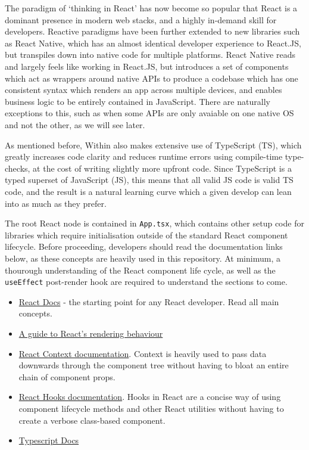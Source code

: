 The paradigm of `thinking in React' has now become so popular that React is a dominant presence in modern web stacks, and a highly in-demand skill for developers. Reactive paradigms have been further extended to new libraries such as React Native, which has an almost identical developer experience to React.JS, but transpiles down into native code for multiple platforms. React Native reads and largely feels like working in React.JS, but introduces a set of components which act as wrappers around native APIs to produce a codebase which has one consistent syntax which renders an app across multiple devices, and enables business logic to be entirely contained in JavaScript. There are naturally exceptions to this, such as when some APIs are only avaiable on one native OS and not the other, as we will see later.

As mentioned before, Within also makes extensive use of TypeScript (TS), which greatly increases code clarity and reduces runtime errors using compile-time type-checks, at the cost of writing slightly more upfront code. Since TypeScript is a typed superset of JavaScript (JS), this means that all valid JS code is valid TS code, and the result is a natural learning curve which a given develop can lean into as much as they prefer.

The root React node is contained in \texttt{App.tsx}, which contains other setup code for libraries which require initialisation outside of the standard React component lifecycle. Before proceeding, developers should read the documentation links below, as these concepts are heavily used in this repository. At minimum, a thourough understanding of the React component life cycle, as well as the \texttt{useEffect} post-render hook are required to understand the sections to come.

\begin{itemize}
    \item \href{https://reactjs.org/docs/hello-world.html}{React Docs} - the starting point for any React developer. Read all main concepts.
    \item \href{https://blog.isquaredsoftware.com/2020/05/blogged-answers-a-mostly-complete-guide-to-react-rendering-behavior/#rendering-process-overview}{A guide to React's rendering behaviour}
    \item \href{https://reactjs.org/docs/context.html}{React Context documentation}. Context is heavily used to pass data downwards through the component tree without having to bloat an entire chain of component props.
    \item \href{https://reactjs.org/docs/hooks-intro.html}{React Hooks documentation}. Hooks in React are a concise way of using component lifecycle methods and other React utilities without having to create a verbose class-based component.
    \item \href{https://www.typescriptlang.org/docs/}{Typescript Docs}
\end{itemize}

